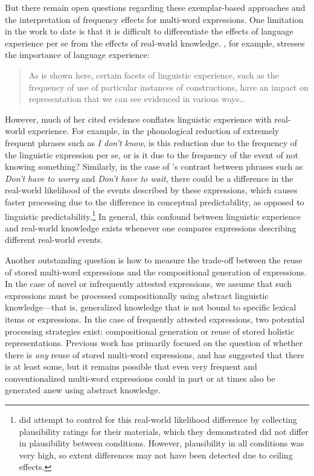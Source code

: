 \documentclass[authoryear]{elsarticle}
\begin{document}
But there remain open questions regarding these exemplar-based approaches and the interpretation of frequency effects for multi-word expressions. One limitation in the work to date is that it is difficult to differentiate the effects of language experience per se from the effects of real-world knowledge. \citet{Bybee:2006ul}, for example, stresses the importance of language experience:
\begin{quote}
As is shown here, certain facets of linguistic experience, such as the frequency of use of particular instances of constructions, have an impact on representation that we can see evidenced in various ways\ldots
\end{quote}
However, much of her cited evidence conflates linguistic experience with real-world experience. For example, in the phonological reduction of extremely frequent phrases such as \emph{I don't know}, is this reduction due to the frequency of the linguistic expression per se, or is it due to the frequency of the event of not knowing something? Similarly, in the case of \citeauthor{Arnon:2010hz}'s contrast between phrases such as \emph{Don't have to worry} and \emph{Don't have to wait}, there could be a difference in the real-world likelihood of the events described by these expressions, which causes faster processing due to the difference in conceptual predictability, as opposed to linguistic predictability.\footnote{\citeauthor{Arnon:2010hz} did attempt to control for this real-world likelihood difference by collecting plausibility ratings for their materials, which they demonstrated did not differ in plausibility between conditions. However, plausibility in all conditions was very high, so extent differences may not have been detected due to ceiling effects.}  In general, this confound between linguistic experience and real-world knowledge exists whenever one compares expressions describing different real-world events.

	Another outstanding question is how to measure the trade-off between the reuse of stored multi-word expressions and the compositional generation of expressions. In the case of novel or infrequently attested expressions, we assume that such expressions must be processed compositionally using abstract linguistic knowledge---that is, generalized knowledge that is not bound to specific lexical items or expressions. In the case of frequently attested expressions, two potential processing strategies exist: compositional generation or reuse of stored holistic representations. Previous work has primarily focused on the question of whether there is \emph{any} reuse of stored multi-word expressions, and has suggested that there is at least some, but it remains possible that even very frequent and conventionalized multi-word expressions could in part or at times also be generated anew using abstract knowledge.
\end{document}
